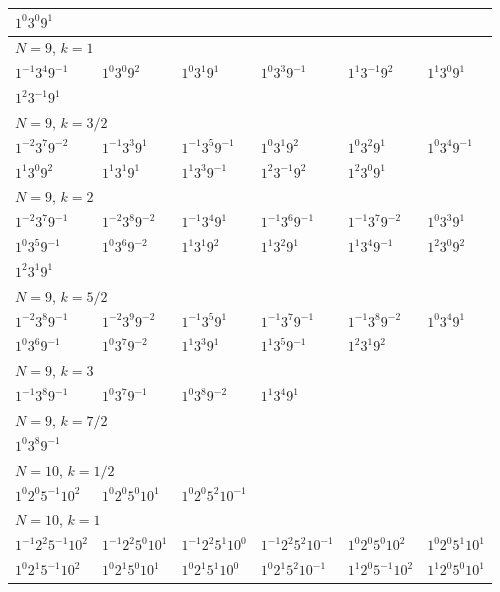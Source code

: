 \documentclass[12pt]{amsart}
\numberwithin{equation}{section}
\theoremstyle{plain}
\theoremstyle{definition}
\theoremstyle{remark}
\begin{document}
\begin{longtable}{llllll}
$1^{0}3^{0}9^{1}$ & &&&&\\
\midrule
\multicolumn{6}{l}{$N=9$, $k=1$}\\
$1^{-1}3^{4}9^{-1}$ & $1^{0}3^{0}9^{2}$ & $1^{0}3^{1}9^{1}$ & $1^{0}3^{3}9^{-1}$ & $1^{1}3^{-1}9^{2}$ & $1^{1}3^{0}9^{1}$\\
$1^{2}3^{-1}9^{1}$ & &&&&\\
\midrule
\multicolumn{6}{l}{$N=9$, $k=3/2$}\\
$1^{-2}3^{7}9^{-2}$ & $1^{-1}3^{3}9^{1}$ & $1^{-1}3^{5}9^{-1}$ & $1^{0}3^{1}9^{2}$ & $1^{0}3^{2}9^{1}$ & $1^{0}3^{4}9^{-1}$\\
$1^{1}3^{0}9^{2}$ & $1^{1}3^{1}9^{1}$ & $1^{1}3^{3}9^{-1}$ & $1^{2}3^{-1}9^{2}$ & $1^{2}3^{0}9^{1}$ & \\
\midrule
\multicolumn{6}{l}{$N=9$, $k=2$}\\
$1^{-2}3^{7}9^{-1}$ & $1^{-2}3^{8}9^{-2}$ & $1^{-1}3^{4}9^{1}$ & $1^{-1}3^{6}9^{-1}$ & $1^{-1}3^{7}9^{-2}$ & $1^{0}3^{3}9^{1}$\\
$1^{0}3^{5}9^{-1}$ & $1^{0}3^{6}9^{-2}$ & $1^{1}3^{1}9^{2}$ & $1^{1}3^{2}9^{1}$ & $1^{1}3^{4}9^{-1}$ & $1^{2}3^{0}9^{2}$\\
$1^{2}3^{1}9^{1}$ & &&&&\\
\midrule
\multicolumn{6}{l}{$N=9$, $k=5/2$}\\
$1^{-2}3^{8}9^{-1}$ & $1^{-2}3^{9}9^{-2}$ & $1^{-1}3^{5}9^{1}$ & $1^{-1}3^{7}9^{-1}$ & $1^{-1}3^{8}9^{-2}$ & $1^{0}3^{4}9^{1}$\\
$1^{0}3^{6}9^{-1}$ & $1^{0}3^{7}9^{-2}$ & $1^{1}3^{3}9^{1}$ & $1^{1}3^{5}9^{-1}$ & $1^{2}3^{1}9^{2}$ & \\
\midrule
\multicolumn{6}{l}{$N=9$, $k=3$}\\
$1^{-1}3^{8}9^{-1}$ & $1^{0}3^{7}9^{-1}$ & $1^{0}3^{8}9^{-2}$ & $1^{1}3^{4}9^{1}$ & &\\
\midrule
\multicolumn{6}{l}{$N=9$, $k=7/2$}\\
$1^{0}3^{8}9^{-1}$ & &&&&\\
\midrule
\multicolumn{6}{l}{$N=10$, $k=1/2$}\\
$1^{0}2^{0}5^{-1}10^{2}$ & $1^{0}2^{0}5^{0}10^{1}$ & $1^{0}2^{0}5^{2}10^{-1}$ & &&\\
\midrule
\multicolumn{6}{l}{$N=10$, $k=1$}\\
$1^{-1}2^{2}5^{-1}10^{2}$ & $1^{-1}2^{2}5^{0}10^{1}$ & $1^{-1}2^{2}5^{1}10^{0}$ & $1^{-1}2^{2}5^{2}10^{-1}$ & $1^{0}2^{0}5^{0}10^{2}$ & $1^{0}2^{0}5^{1}10^{1}$\\
$1^{0}2^{1}5^{-1}10^{2}$ & $1^{0}2^{1}5^{0}10^{1}$ & $1^{0}2^{1}5^{1}10^{0}$ & $1^{0}2^{1}5^{2}10^{-1}$ & $1^{1}2^{0}5^{-1}10^{2}$ & $1^{1}2^{0}5^{0}10^{1}$\\

\end{longtable}
\end{document}
